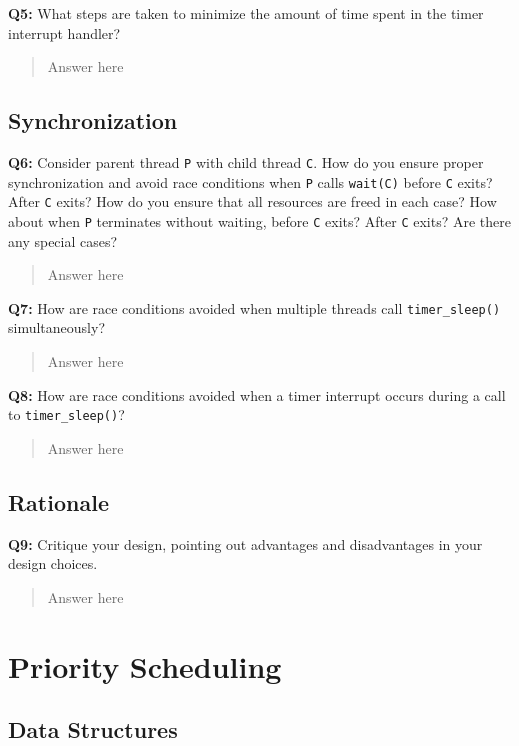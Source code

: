 \documentclass[a4paper,11pt]{paper}
\begin{document}
\textbf{Q5:} What steps are taken to minimize the amount of time spent in the timer interrupt handler?
\begin{quote}
  Answer here
\end{quote}


\subsection{Synchronization}

\textbf{Q6:} Consider parent thread \texttt{P} with child thread \texttt{C}.  How do you ensure proper synchronization and avoid race conditions when \texttt{P} calls \texttt{wait(C)} before \texttt{C} exits?  After \texttt{C} exits?  How do you ensure that all resources are freed in each case?  How about when \texttt{P} terminates without waiting, before \texttt{C} exits?  After \texttt{C} exits?  Are there any special cases?
\begin{quote}
  Answer here
\end{quote}

\textbf{Q7:} How are race conditions avoided when multiple threads call \texttt{timer\_sleep()} simultaneously?
\begin{quote}
  Answer here
\end{quote}

\textbf{Q8:} How are race conditions avoided when a timer interrupt occurs during a call to \texttt{timer\_sleep()}?
\begin{quote}
  Answer here
\end{quote}


\subsection{Rationale}

\textbf{Q9:} Critique your design, pointing out advantages and disadvantages in your design choices.
\begin{quote}
  Answer here
\end{quote}




\section{Priority Scheduling}

\subsection{Data Structures}
\end{document}
